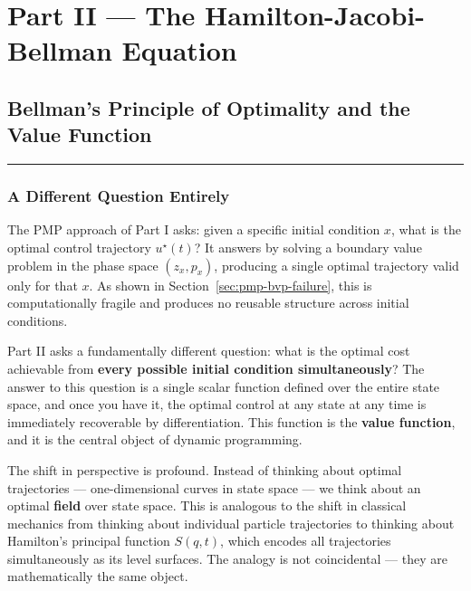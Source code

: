 \documentclass{article}
\begin{document}
\pagebreak







\section{Part II --- The Hamilton-Jacobi-Bellman Equation}

\subsection{Bellman's Principle of Optimality and the Value Function}
\label{sec:hjb}

\medskip\hrule\medskip

\subsubsection{A Different Question Entirely}

\begin{tldrbox}
The PMP approach of Part I asks: given a specific initial condition $x$, what is the optimal control trajectory $u^\star(t)$? It answers by solving a boundary value problem in the phase space $(z_x, p_x)$, producing a single optimal trajectory valid only for that $x$. As shown in Section~\ref{sec:pmp-bvp-failure}, this is computationally fragile and produces no reusable structure across initial conditions.


Part II asks a fundamentally different question: what is the optimal cost achievable from \textbf{every possible initial condition simultaneously}? The answer to this question is a single scalar function defined over the entire state space, and once you have it, the optimal control at any state at any time is immediately recoverable by differentiation. This function is the \textbf{value function}, and it is the central object of dynamic programming.
\end{tldrbox}

\begin{physicsinsightbox}
The shift in perspective is profound. Instead of thinking about optimal trajectories — one-dimensional curves in state space — we think about an optimal \textbf{field} over state space. This is analogous to the shift in classical mechanics from thinking about individual particle trajectories to thinking about Hamilton's principal function $S(q, t)$, which encodes all trajectories simultaneously as its level surfaces. The analogy is not coincidental — they are mathematically the same object.
\end{physicsinsightbox}
\end{document}
